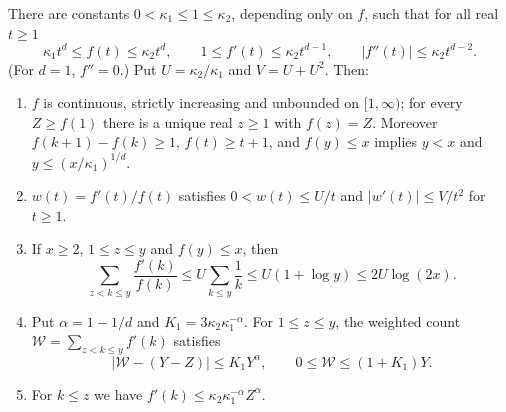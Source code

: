 \begin{lemma}\label{lem:poly}
There are constants $0<\kappa_1\le1\le\kappa_2$, depending only on $f$, such that for all real $t\ge1$
\begin{equation}\label{eq:kappa}
\kappa_1t^d\le f(t)\le\kappa_2t^d,\qquad1\le f'(t)\le\kappa_2t^{d-1},\qquad|f''(t)|\le\kappa_2t^{d-2}.
\end{equation}
(For $d=1$, $f''=0$.) Put $U=\kappa_2/\kappa_1$ and $V=U+U^2$. Then:
\begin{enumerate}[label=(\alph*)]
\item $f$ is continuous, strictly increasing and unbounded on $[1,\infty)$; for every $Z\ge f(1)$ there is a unique real $z\ge1$ with $f(z)=Z$. Moreover $f(k+1)-f(k)\ge1$, $f(t)\ge t+1$, and $f(y)\le x$ implies $y<x$ and $y\le(x/\kappa_1)^{1/d}$.
\item $w(t)=f'(t)/f(t)$ satisfies $0<w(t)\le U/t$ and $|w'(t)|\le V/t^2$ for $t\ge1$.
\item If $x\ge2$, $1\le z\le y$ and $f(y)\le x$, then
\begin{equation}\label{eq:sum-w}
\sum_{z<k\le y}\frac{f'(k)}{f(k)}\le U\sum_{k\le y}\frac1k\le U(1+\log y)\le2U\log(2x).
\end{equation}
\item Put $\alpha=1-1/d$ and $K_1=3\kappa_2\kappa_1^{-\alpha}$. For $1\le z\le y$, the weighted count $\mathcal W=\sum_{z<k\le y}f'(k)$ satisfies
\begin{equation}\label{eq:weight-count}
|\mathcal W-(Y-Z)|\le K_1Y^{\alpha},\qquad0\le\mathcal W\le(1+K_1)Y.
\end{equation}
\item For $k\le z$ we have $f'(k)\le\kappa_2\kappa_1^{-\alpha}Z^{\alpha}$.
\end{enumerate}
\end{lemma}

